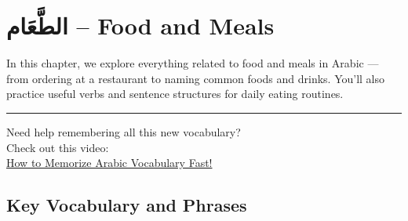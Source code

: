\documentclass[
  a4paper,
  DIV=11,
  numbers=noendperiod]{scrartcl}
\begin{document}
\section{الطَّعَام -- Food and Meals}\label{unit4-food}

In this chapter, we explore everything related to food and meals in
Arabic --- from ordering at a restaurant to naming common foods and
drinks. You'll also practice useful verbs and sentence structures for
daily eating routines.

\begin{center}\rule{0.5\linewidth}{0.5pt}\end{center}

\begin{tcolorbox}[enhanced jigsaw, bottomrule=.15mm, arc=.35mm, colbacktitle=quarto-callout-tip-color!10!white, opacityback=0, toptitle=1mm, title=\textcolor{quarto-callout-tip-color}{\faLightbulb}\hspace{0.5em}{Watch This!}, colframe=quarto-callout-tip-color-frame, opacitybacktitle=0.6, colback=white, coltitle=black, titlerule=0mm, left=2mm, toprule=.15mm, bottomtitle=1mm, rightrule=.15mm, leftrule=.75mm, breakable]

Need help remembering all this new vocabulary?\\
Check out this video:\\
\href{https://www.youtube.com/watch?v=TZYOScgVc3g&t}{How to Memorize
Arabic Vocabulary Fast!}

\end{tcolorbox}

\subsection{Key Vocabulary and
Phrases}\label{key-vocabulary-and-phrases-3}
\end{document}

